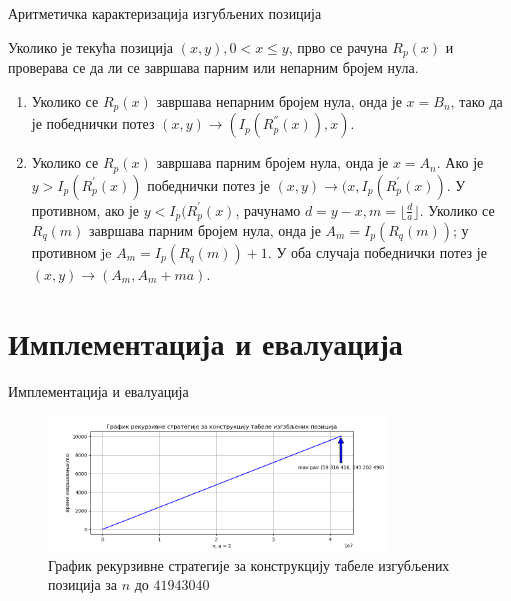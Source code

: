 \documentclass[10pt]{beamer}
\theoremstyle{remark}
\theoremstyle{definition}
\begin{document}
	\begin{frame}{Аритметичка карактеризација изгубљених позиција}
		
		Уколико је текућа позиција $ (x, y), 0 < x \leq y $, прво се рачуна $ R_{p}(x) $ и проверава се да ли се завршава парним или непарним бројем нула.
		
		\begin{enumerate}
			\item \label{item:neparne_nule} Уколико се $ R_{p}(x) $ завршава непарним бројем нула, онда је $ x = B_{n} $, тако да је победнички потез $ (x, y) \rightarrow (I_{p}(R^{''}_{p}(x)), x) $.
			\item \label{item:parne_nule} Уколико се $ R_{p}(x) $ завршава парним бројем нула, онда је $ x = A_{n} $. Ако је $ y > I_{p}(R^{'}_{p}(x)) $ победнички потез је $ (x, y) \rightarrow (x, I_{p}(R^{'}_{p}(x)) $. У противном, ако је $ y < I_{p}(R^{'}_{p}(x) $, рачунамо $ d = y - x, m = \lfloor \frac{d}{a} \rfloor $. Уколико се $ R_{q}(m) $ завршава парним бројем нула, онда је $ A_{m} = I_{p}(R_{q}(m)) $; у противном je $ A_{m} = I_{p}(R_{q}(m)) + 1 $.
			У оба случаја победнички потез је $ (x, y) \rightarrow (A_{m}, A_{m} + ma) $.
		\end{enumerate}		
	\end{frame}

\section{Имплементација и евалуација}

\begin{frame}{Имплементација и евалуација}
	
	\begin{figure}
		\centering
		\includegraphics[width=0.8\textwidth]{../src/statistics/picture/recursive.png}
		\caption{График рекурзивне стратегије за конструкцију табеле изгубљених позиција
		за $ n $ до $ 41943040 $}
	\end{figure}
	
\end{frame}
\end{document}
